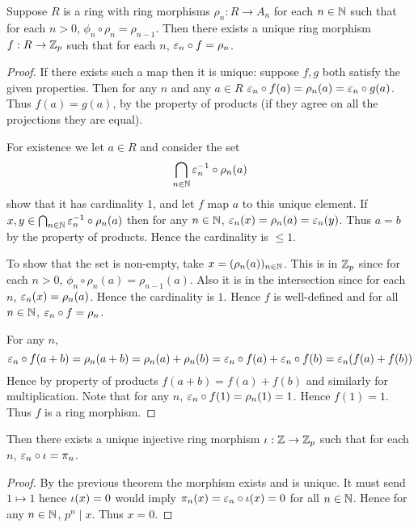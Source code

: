 \begin{prop}
    Suppose $R$ is a ring with ring morphisms 
    $\rho_n : R \to A_n$ for each $n \in \mathbb{N}$
    such that for each $n > 0$, 
    $\phi_n \circ \rho_n = \rho_{n-1}$.
    Then there exists a unique ring morphism $f : R \to \mathbb{Z}_p$
    such that for each $n$, 
    $\varepsilon_n \circ f = \rho_n$.
\end{prop}
\begin{proof}
    If there exists such a map then it is unique:
    suppose $f,g$ both satisfy the given properties.
    Then for any $n$ and any $a \in R$
    $\varepsilon_n \circ f (a)= \rho_n (a) = \varepsilon_n \circ g (a)$.
    Thus $f(a) = g(a)$, by the property of products
    (if they agree on all the projections they are equal).

    For existence we let $a \in R$ and consider the set
    \[\bigcap_{n \in \mathbb{N}} {\varepsilon_n^{-1} \circ \rho_n (a)}\]
    show that it has cardinality $1$,
    and let $f$ map $a$ to this unique element.
    If $x,y \in \bigcap_{n \in \mathbb{N}} {\varepsilon_n^{-1} \circ \rho_n (a)}$
    then for any $n \in \mathbb{N}$, 
    $\varepsilon_n (x) = \rho_n (a) = \varepsilon_n (y)$.
    Thus $a = b$ by the property of products.
    Hence the cardinality is $\le 1$.

    To show that the set is non-empty,
    take $x = (\rho_n (a))_{n \in \mathbb{N}}$.
    This is in $\mathbb{Z}_p$ since for each $n>0$,
    $\phi_n \circ \rho_n(a) = \rho_{n - 1}(a)$.
    Also it is in the intersection since for each $n$,
    $\varepsilon_n(x) = \rho_n(a)$. 
    Hence the cardinality is $1$.
    Hence $f$ is well-defined and for all $n \in \mathbb{N}$, 
    $\varepsilon_n \circ f = \rho_n$.

    For any $n$, 
    \[\varepsilon_n \circ f (a + b) = \rho_n (a + b) = \rho_n (a) + \rho_n (b)
    = \varepsilon_n \circ f(a) + \varepsilon_n \circ f(b) = \varepsilon_n (f(a) + f(b))\]
    Hence by property of products $f(a + b) = f(a) + f(b)$
    and similarly for multiplication.
    Note that for any $n$, 
    $\varepsilon_n \circ f(1) = \rho_n (1) = 1$.
    Hence $f(1) = 1$.
    Thus $f$ is a ring morphism.
\end{proof}

\begin{cor}
    Then there exists a unique injective ring morphism 
    $\iota : \mathbb{Z} \to \mathbb{Z}_p$
    such that for each $n$, 
    $\varepsilon_n \circ \iota = \pi_n$.
\end{cor}
\begin{proof}
    By the previous theorem the morphism exists and is unique.
    It must send $1 \mapsto 1$ hence $\iota(x) = 0$ would imply
    $\pi_n (x) = \varepsilon_n \circ \iota(x) = 0$ for all $n \in \mathbb{N}$.
    Hence for any $n \in \mathbb{N}$, 
    $p^n \mid x$.
    Thus $x = 0$.
\end{proof}

